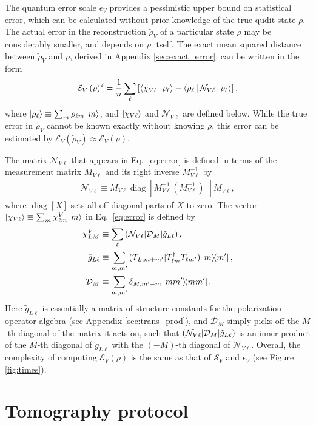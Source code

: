 \documentclass[notitlepage,twocolumn]{revtex4-2}
\newcommand{\f}[2]{\dfrac{#1}{#2}} %
\newcommand{\p}[1]{\left(#1\right)} %
\renewcommand{\sp}[1]{\left[#1\right]} %
\newcommand{\bk}{\Braket} %
\newcommand{\D}{\mathcal{D}}
\newcommand{\E}{\mathcal{E}}
\newcommand{\N}{\mathcal{N}}
\renewcommand{\S}{\mathcal{S}}
\def\obk#1{\mathinner{({#1})}}
\DeclareMathOperator{\diag}{diag}
\begin{document}
The quantum error scale $\epsilon_V$ provides a pessimistic upper bound on statistical error, which can be calculated without prior knowledge of the true qudit state $\rho$.
The actual error in the reconstruction $\tilde\rho_V$ of a particular state $\rho$ may be considerably smaller, and depends on $\rho$ itself.
The exact mean squared distance between $\tilde\rho_V$ and $\rho$, derived in Appendix \ref{sec:exact_error}, can be written in the form
\begin{align}
  \E_V\p{\rho}^2
  = \f1n \sum_\ell \sp{\bk{\chi_{V\ell}|\rho_\ell}
    - \bk{\rho_\ell|\N_{V\ell}|\rho_\ell}},
  \label{eq:error}
\end{align}
where $\ket{\rho_\ell} \equiv \sum_m \rho_{\ell m}\ket{m}$, and $\ket{\chi_{V\ell}}$ and $\N_{V\ell}$ are defined below.
While the true error in $\tilde\rho_V$ cannot be known exactly without knowing $\rho$, this error can be estimated by $\E_V\p{\tilde\rho_V} \approx \E_V\p{\rho}$.

The matrix $\N_{V\ell}$ that appears in Eq.~\eqref{eq:error} is defined in terms of the measurement matrix $M_{V\ell}$ and its right inverse $M_{V\ell}^{-1}$ by
\begin{align}
  \N_{V\ell} \equiv M_{V\ell} \diag\sp{M_{V\ell}^{-1}
    \p{M_{V\ell}^{-1}}^\dag} M_{V\ell}^\dag,
\end{align}
where $\diag\sp{X}$ sets all off-diagonal parts of $X$ to zero.
The vector $\ket{\chi_{V\ell}}\equiv\sum_m \chi^V_{\ell m} \ket{m}$ in Eq.~\eqref{eq:error} is defined by
\begin{align}
  \chi^V_{LM} &\equiv
  \sum_\ell \obk{\N_{V\ell}|\D_M|\tilde g_{L\ell}}, \\
  \tilde g_{L\ell} &\equiv \sum_{m,m'}
  \obk{T_{L,m+m'}|T_{\ell m}^\dag T_{\ell m'}} \op{m}{m'}, \\
  \D_M &\equiv \sum_{m,m'} \delta_{M,m'-m} \op{mm'}.
\end{align}
Here $\tilde g_{L\ell}$ is essentially a matrix of structure constants for the polarization operator algebra (see Appendix \ref{sec:trans_prod}), and $\D_M$ simply picks off the $M$-th diagonal of the matrix it acts on, such that $\obk{\N_{V\ell}|\D_M|\tilde g_{L\ell}}$ is an inner product of the $M$-th diagonal of $\tilde g_{L\ell}$ with the $\p{-M}$-th diagonal of $\N_{V\ell}$.
Overall, the complexity of computing $\E_V\p{\rho}$ is the same as that of $\S_V$ and $\epsilon_V$ (see Figure \ref{fig:times}).

\section{Tomography protocol}
\label{sec:protocol}
\end{document}
